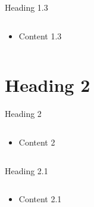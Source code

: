\documentclass{sintefbeamer}
\begin{document}
\begin{frame}{Heading 1.3}
    \begin{columns}
        \begin{column}{0.6\textwidth}
            \begin{itemize}
                \item Content 1.3
            \end{itemize}
        \end{column}
        \begin{column}{0.3\textwidth}
            
        \end{column}
    \end{columns}
\end{frame}

\section{Heading 2}

\begin{frame}{Heading 2}
    \begin{columns}
        \begin{column}{0.6\textwidth}
            \begin{itemize}
                \item Content 2
            \end{itemize}
        \end{column}
        \begin{column}{0.3\textwidth}
            
        \end{column}
    \end{columns}
\end{frame}

\begin{frame}{Heading 2.1}
    \begin{columns}
        \begin{column}{0.6\textwidth}
            \begin{itemize}
                \item Content 2.1
            \end{itemize}
        \end{column}
        \begin{column}{0.3\textwidth}
            
        \end{column}
    \end{columns}
\end{frame}
\end{document}
